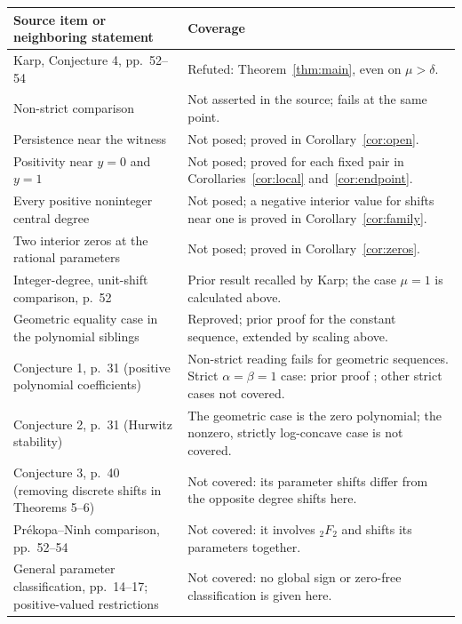 \documentclass[11pt]{article}
\begin{document}
\begin{center}
\small
\begin{tabular}{@{}p{.44\linewidth}p{.49\linewidth}@{}}
\toprule
Source item or neighboring statement & Coverage\\
\midrule
Karp, Conjecture 4, pp.~52--54 & Refuted: Theorem~\ref{thm:main}, even on $\mu>\delta$.\\
Non-strict comparison & Not asserted in the source; fails at the same point.\\
Persistence near the witness & Not posed; proved in Corollary~\ref{cor:open}.\\
Positivity near $y=0$ and $y=1$ & Not posed; proved for each fixed pair in Corollaries~\ref{cor:local} and~\ref{cor:endpoint}.\\
Every positive noninteger central degree & Not posed; a negative interior value for shifts near one is proved in Corollary~\ref{cor:family}.\\
Two interior zeros at the rational parameters & Not posed; proved in Corollary~\ref{cor:zeros}.\\
Integer-degree, unit-shift comparison, p.~52 & Prior result recalled by Karp; the case $\mu=1$ is calculated above.\\
Geometric equality case in the polynomial siblings & Reproved; prior proof \cite[Lemma~3]{karppolynomial} for the constant sequence, extended by scaling above.\\
Conjecture 1, p.~31 (positive polynomial coefficients) & Non-strict reading fails for geometric sequences. Strict $\alpha=\beta=1$ case: prior proof \cite[Theorem~1]{karppolynomial}; other strict cases not covered.\\
Conjecture 2, p.~31 (Hurwitz stability) & The geometric case is the zero polynomial; the nonzero, strictly log-concave case is not covered.\\
Conjecture 3, p.~40 (removing discrete shifts in Theorems 5--6) & Not covered: its parameter shifts differ from the opposite degree shifts here.\\
Pr\'ekopa--Ninh comparison, pp.~52--54 & Not covered: it involves ${}_2F_2$ and shifts its parameters together.\\
General parameter classification, pp.~14--17; positive-valued restrictions & Not covered: no global sign or zero-free classification is given here.\\
\bottomrule
\end{tabular}
\end{center}
\end{document}
